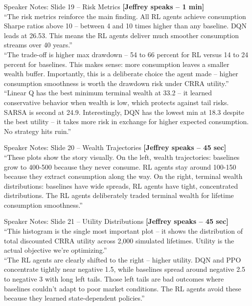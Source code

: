 \documentclass[aspectratio=169, 11pt]{beamer}
\begin{document}
\begin{frame}[allowframebreaks]{Speaker Notes: Slide 19 -- Risk Metrics}
\textbf{[Jeffrey speaks -- 1 min]}\\
``The risk metrics reinforce the main finding. All RL agents achieve consumption Sharpe ratios above 10 -- between 4 and 10 times higher than any baseline. DQN leads at 26.53. This means the RL agents deliver much smoother consumption streams over 40 years.''\\[0.5em]
``The trade-off is higher max drawdown -- 54 to 66 percent for RL versus 14 to 24 percent for baselines. This makes sense: more consumption leaves a smaller wealth buffer. Importantly, this is a deliberate choice the agent made -- higher consumption smoothness is worth the drawdown risk under CRRA utility.''\\[0.5em]
``Linear Q has the best minimum terminal wealth at 33.2 -- it learned conservative behavior when wealth is low, which protects against tail risks. SARSA is second at 24.9. Interestingly, DQN has the lowest min at 18.3 despite the best utility -- it takes more risk in exchange for higher expected consumption. No strategy hits ruin.''
\end{frame}

\begin{frame}[allowframebreaks]{Speaker Notes: Slide 20 -- Wealth Trajectories}
\textbf{[Jeffrey speaks -- 45 sec]}\\
``These plots show the story visually. On the left, wealth trajectories: baselines grow to 400-500 because they never consume. RL agents stay around 100-150 because they extract consumption along the way. On the right, terminal wealth distributions: baselines have wide spreads, RL agents have tight, concentrated distributions. The RL agents deliberately traded terminal wealth for lifetime consumption smoothness.''
\end{frame}

\begin{frame}[allowframebreaks]{Speaker Notes: Slide 21 -- Utility Distributions}
\textbf{[Jeffrey speaks -- 45 sec]}\\
``This histogram is the single most important plot -- it shows the distribution of total discounted CRRA utility across 2,000 simulated lifetimes. Utility is the actual objective we're optimizing.''\\[0.5em]
``The RL agents are clearly shifted to the right -- higher utility. DQN and PPO concentrate tightly near negative 1.5, while baselines spread around negative 2.5 to negative 3 with long left tails. Those left tails are bad outcomes where baselines couldn't adapt to poor market conditions. The RL agents avoid these because they learned state-dependent policies.''
\end{frame}
\end{document}
